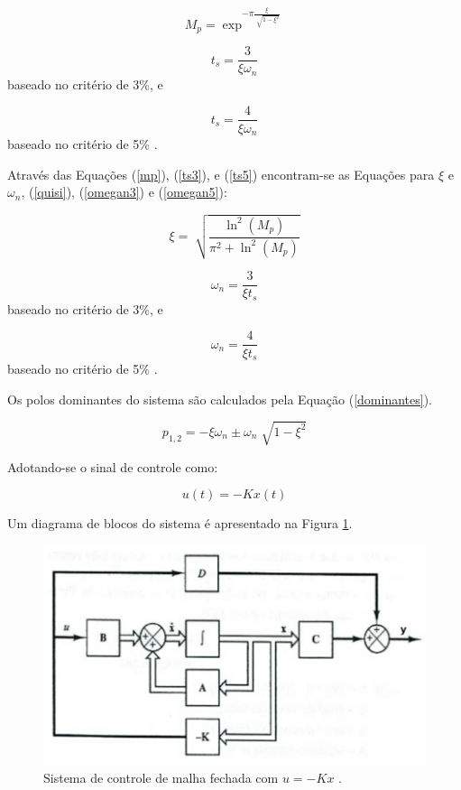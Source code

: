 \documentclass[journal,brazil,english]{IEEEtran}
\begin{document}
\begin{equation}\label{mp}
M_p = \exp ^{-\pi\frac{\xi}{\sqrt[]{1-\xi ^2}}}
\end{equation}

\begin{equation}\label{ts3}
t_s = \frac{3}{\xi \omega _n}
\end{equation}
baseado no critério de 3\%, e

\begin{equation}\label{ts5}
t_s = \frac{4}{\xi \omega _n}
\end{equation}
baseado no critério de 5\% \cite{ogata}.

Através das Equações (\ref{mp}), (\ref{ts3}), e (\ref{ts5}) encontram-se as Equações para $\xi$ e $\omega _n$, (\ref{quisi}), (\ref{omegan3}) e (\ref{omegan5}):

\begin{equation}\label{quisi}
\xi = \sqrt[]{\frac{\ln ^2(M_p)}{\pi ^2 + \ln ^2(M_p)}}
\end{equation}

\begin{equation}\label{omegan3}
\omega _n = \frac{3}{\xi t_s}
\end{equation}
baseado no critério de 3\%, e

\begin{equation}\label{omegan5}
\omega _n = \frac{4}{\xi t_s}
\end{equation}
baseado no critério de 5\% \cite{ogata}.

Os polos dominantes do sistema \cite{ogata} são calculados pela Equação (\ref{dominantes}).

\begin{equation}\label{dominantes}
p_{1,2} = -\xi \omega _n \pm \omega _n \sqrt[]{1-\xi ^2}
\end{equation}

Adotando-se o sinal de controle como:

\begin{equation}\label{uEE}
u(t)=-Kx(t)
\end{equation}

Um diagrama de blocos do sistema é apresentado na Figura \ref{diagrama}.
\begin{figure}[H]
	\centering
	\includegraphics[width=\columnwidth]{./imagens/realimentacaoK.pdf}
	\renewcommand{\figurename}{Fig.}
    \caption{Sistema de controle de malha fechada com $u=-Kx$ \cite{ogata}.}
	\label{diagrama}
\end{figure}
\end{document}
